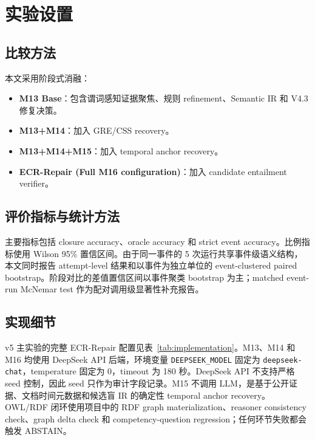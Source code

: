 \documentclass[11pt]{article}
\begin{document}
\section{实验设置}

\subsection{比较方法}

本文采用阶段式消融：

\begin{itemize}
    \item \textbf{M13 Base}：包含谓词感知证据聚焦、规则 refinement、Semantic IR 和 V4.3 修复决策。
    \item \textbf{M13+M14}：加入 GRE/CSS recovery。
    \item \textbf{M13+M14+M15}：加入 temporal anchor recovery。
    \item \textbf{ECR-Repair (Full M16 configuration)}：加入 candidate entailment verifier。
\end{itemize}

\subsection{评价指标与统计方法}

主要指标包括 closure accuracy、oracle accuracy 和 strict event accuracy。比例指标使用 Wilson 95\% 置信区间。由于同一事件的 5 次运行共享事件级语义结构，本文同时报告 attempt-level 结果和以事件为独立单位的 event-clustered paired bootstrap。阶段对比的差值置信区间以事件聚类 bootstrap 为主；matched event-run McNemar test 作为配对调用级显著性补充报告。

\subsection{实现细节}

v5 主实验的完整 ECR-Repair 配置见表~\ref{tab:implementation}。M13、M14 和 M16 均使用 DeepSeek API 后端，环境变量 \texttt{DEEPSEEK\_MODEL} 固定为 \texttt{deepseek-chat}，temperature 固定为 0，timeout 为 180 秒。DeepSeek API 不支持严格 seed 控制，因此 seed 只作为审计字段记录。M15 不调用 LLM，是基于公开证据、文档时间元数据和候选盲 IR 的确定性 temporal anchor recovery。OWL/RDF 闭环使用项目中的 RDF graph materialization、reasoner consistency check、graph delta check 和 competency-question regression；任何环节失败都会触发 ABSTAIN。
\end{document}
